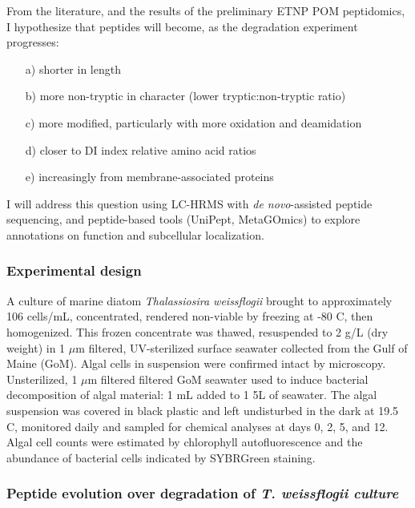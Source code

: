 \documentclass[12pt, letterpaper, twoside]{article}
\begin{document}
From the literature, and the results of the preliminary ETNP POM peptidomics, I hypothesize that peptides will become, as the degradation experiment progresses:

\bigskip

\renewcommand{\labelenumi}{\alph{enumi}}
\begin{enumerate}
	\item[a)] shorter in length
	\item[b)] more non-tryptic in character (lower tryptic:non-tryptic ratio)
	\item[c)] more modified, particularly with more oxidation and deamidation
	\item[d)] closer to DI index relative amino acid ratios
	\item[e)] increasingly from membrane-associated proteins
\end{enumerate}

\bigskip

I will address this question using LC-HRMS with \textit{de novo}-assisted peptide sequencing, and peptide-based tools (UniPept, MetaGOmics) to explore annotations on function and subcellular localization.

\subsubsection{Experimental design}

A culture of marine diatom \textit{Thalassiosira weissflogii} brought to approximately 106 cells/mL, concentrated, rendered non-viable by freezing at  -80 C, then homogenized. This frozen concentrate was thawed, resuspended to 2 g/L (dry weight) in 1 $ \mu $m filtered, UV-sterilized surface seawater collected from the Gulf of Maine (GoM). Algal cells in suspension were confirmed intact by microscopy. Unsterilized, 1 $ \mu $m filtered filtered GoM seawater used to induce bacterial decomposition of algal material: 1  mL added to 1 5L of seawater. The algal suspension was covered in black plastic and left undisturbed in the dark at 19.5 C, monitored daily and sampled for chemical analyses at days 0, 2, 5, and 12. Algal cell counts were estimated by chlorophyll autofluorescence and the abundance of bacterial cells indicated by SYBRGreen staining. 


\subsubsection{Peptide evolution over degradation of \textit{T. weissflogii culture}}
\end{document}
